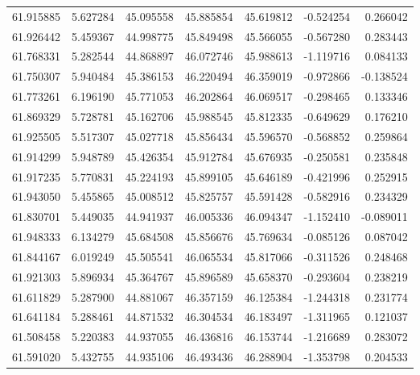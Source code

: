 \begin{tabular}{rrrrrrr}
 61.915885 &   5.627284 &         45.095558 &         45.885854 &         45.619812 & -0.524254 &  0.266042 \\
 61.926442 &   5.459367 &         44.998775 &         45.849498 &         45.566055 & -0.567280 &  0.283443 \\
 61.768331 &   5.282544 &         44.868897 &         46.072746 &         45.988613 & -1.119716 &  0.084133 \\
 61.750307 &   5.940484 &         45.386153 &         46.220494 &         46.359019 & -0.972866 & -0.138524 \\
 61.773261 &   6.196190 &         45.771053 &         46.202864 &         46.069517 & -0.298465 &  0.133346 \\
 61.869329 &   5.728781 &         45.162706 &         45.988545 &         45.812335 & -0.649629 &  0.176210 \\
 61.925505 &   5.517307 &         45.027718 &         45.856434 &         45.596570 & -0.568852 &  0.259864 \\
 61.914299 &   5.948789 &         45.426354 &         45.912784 &         45.676935 & -0.250581 &  0.235848 \\
 61.917235 &   5.770831 &         45.224193 &         45.899105 &         45.646189 & -0.421996 &  0.252915 \\
 61.943050 &   5.455865 &         45.008512 &         45.825757 &         45.591428 & -0.582916 &  0.234329 \\
 61.830701 &   5.449035 &         44.941937 &         46.005336 &         46.094347 & -1.152410 & -0.089011 \\
 61.948333 &   6.134279 &         45.684508 &         45.856676 &         45.769634 & -0.085126 &  0.087042 \\
 61.844167 &   6.019249 &         45.505541 &         46.065534 &         45.817066 & -0.311526 &  0.248468 \\
 61.921303 &   5.896934 &         45.364767 &         45.896589 &         45.658370 & -0.293604 &  0.238219 \\
 61.611829 &   5.287900 &         44.881067 &         46.357159 &         46.125384 & -1.244318 &  0.231774 \\
 61.641184 &   5.288461 &         44.871532 &         46.304534 &         46.183497 & -1.311965 &  0.121037 \\
 61.508458 &   5.220383 &         44.937055 &         46.436816 &         46.153744 & -1.216689 &  0.283072 \\
 61.591020 &   5.432755 &         44.935106 &         46.493436 &         46.288904 & -1.353798 &  0.204533 \\

\end{tabular}
